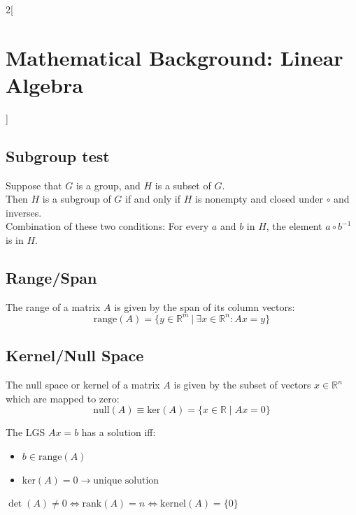\documentclass[oneside,fontsize=11pt,paper=a4]{scrartcl}
\begin{document}
\begin{multicols}{2}[\section{Mathematical Background: Linear Algebra}]
\subsection{Subgroup test}
Suppose that $G$ is a group, and $H$ is a subset of $G$. \\
Then $H$ is a subgroup of $G$ if and only if $H$ is nonempty and closed under $\circ$ and inverses. \\
Combination of these two conditions: For every $a$ and $b$ in $H$, the element $a \circ b^{-1}$ is in $H$.

\subsection{Range/Span}
The range of a matrix $A$ is given by the span of its column vectors:
\begin{equation*}
\text{range}(A) = \{ y \in \mathbb{R}^m \ \vert \ \exists x \in \mathbb{R}^n: Ax=y \}
\end{equation*}

\subsection{Kernel/Null Space}
The null space or kernel of a matrix $A$ is given by the subset of vectors $x \in \mathbb{R}^n$ which are mapped to zero:
\begin{equation*}
    \text{null}(A) \equiv \text{ker}(A) = \{x \in \mathbb{R} \mid Ax = 0 \}
\end{equation*}

The LGS $A x = b$ has a solution iff:
\begin{itemize}
    \item $b \in \text{range}(A)$
    \item $\text{ker}(A) = 0 \rightarrow \text{unique solution}$ 
\end{itemize}
$\det(A) \neq 0 \Leftrightarrow \text{rank}(A) = n \Leftrightarrow \text{kernel}(A) = \{0\}$


\end{multicols}
\end{document}

